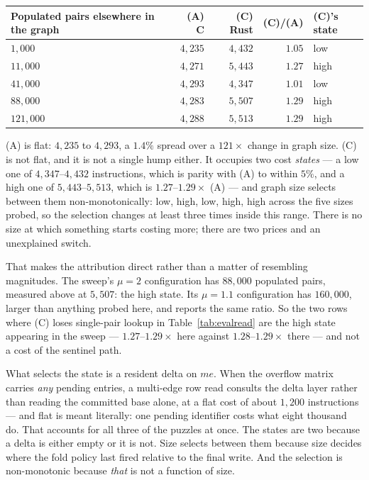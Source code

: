 \documentclass[11pt,a4paper]{article}
\theoremstyle{plain}
\theoremstyle{definition}
\theoremstyle{remark}
\begin{document}
\begin{center}
\small
\begin{tabular}{@{}lrrrl@{}}
\toprule
Populated pairs elsewhere in the graph & (A) C & (C) Rust & (C)/(A) & (C)'s state \\
\midrule
$1{,}000$   & $4{,}235$ & $4{,}432$ & $1.05$ & low \\
$11{,}000$  & $4{,}271$ & $5{,}443$ & $1.27$ & high \\
$41{,}000$  & $4{,}293$ & $4{,}347$ & $1.01$ & low \\
$88{,}000$  & $4{,}283$ & $5{,}507$ & $1.29$ & high \\
$121{,}000$ & $4{,}288$ & $5{,}513$ & $1.29$ & high \\
\bottomrule
\end{tabular}
\end{center}

\noindent
(A) is flat: $4{,}235$ to $4{,}293$, a $1.4\%$ spread over a $121\times$ change
in graph size. (C) is not flat, and it is not a single hump either. It occupies
two cost \emph{states} --- a low one of $4{,}347$--$4{,}432$ instructions,
which is parity with (A) to within $5\%$, and a high one of
$5{,}443$--$5{,}513$, which is $1.27$--$1.29\times$ (A) --- and graph size
selects between them non-monotonically: low, high, low, high, high across the
five sizes probed, so the selection changes at least three times inside this
range. There is no size at which something starts costing more; there are two
prices and an unexplained switch.

That makes the attribution direct rather than a matter of resembling
magnitudes. The sweep's $\mu = 2$ configuration has $88{,}000$ populated pairs,
measured above at $5{,}507$: the high state. Its $\mu = 1.1$ configuration has
$160{,}000$, larger than anything probed here, and reports the same ratio. So
the two rows where (C) loses single-pair lookup in Table~\ref{tab:evalread} are
the high state appearing in the sweep --- $1.27$--$1.29\times$ here against
$1.28$--$1.29\times$ there --- and not a cost of the sentinel path.

What selects the state is a resident delta on $me$. When the overflow matrix
carries \emph{any} pending entries, a multi-edge row read consults the delta
layer rather than reading the committed base alone, at a flat cost of about
$1{,}200$ instructions --- and flat is meant literally: one pending identifier
costs what eight thousand do. That accounts for all three of the puzzles at once.
The states are two because a delta is either empty or it is not. Size selects
between them because size decides where the fold policy last fired relative to
the final write. And the selection is non-monotonic because \emph{that} is not a
function of size.
\end{document}
